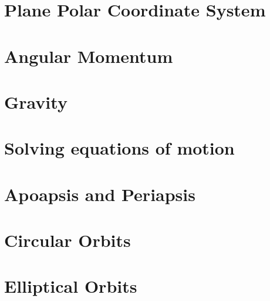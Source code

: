 \documentclass[a5paper,12pt]{article}
\begin{document}

\clearpage
\tableofcontents
\listoftables
\listoffigures
\clearpage

\section{Plane Polar Coordinate System}

\clearpage

\section{Angular Momentum}

\clearpage

\section{Gravity}\label{sec:Gravity}

\clearpage

\section{Solving equations of motion}

\clearpage

\section{Apoapsis and Periapsis}

\clearpage

\section{Circular Orbits}

\clearpage

\section{Elliptical Orbits}

\clearpage
\end{document}

